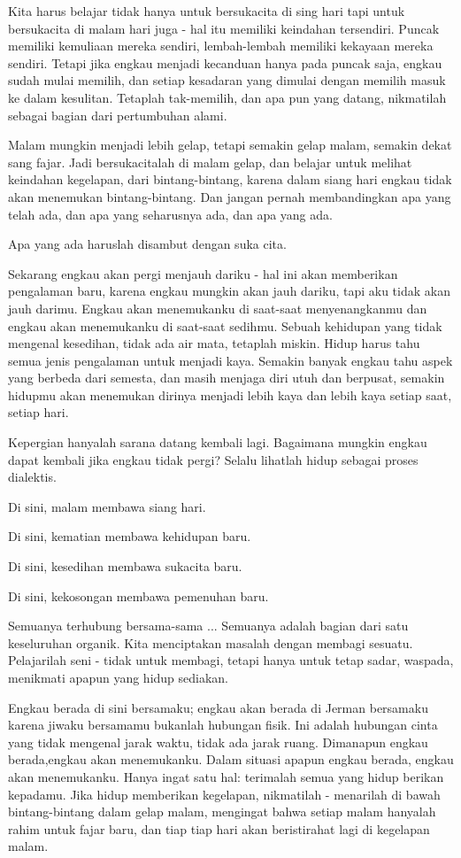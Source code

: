 Kita harus belajar tidak hanya untuk bersukacita di sing hari tapi untuk bersukacita di malam hari juga - hal itu memiliki keindahan tersendiri. Puncak memiliki kemuliaan mereka sendiri, lembah-lembah memiliki kekayaan mereka sendiri. Tetapi jika engkau menjadi kecanduan hanya pada puncak saja, engkau sudah mulai memilih, dan setiap kesadaran yang dimulai dengan memilih masuk ke dalam kesulitan. Tetaplah tak-memilih, dan apa pun yang datang, nikmatilah sebagai bagian dari pertumbuhan alami.

Malam mungkin menjadi lebih gelap, tetapi semakin gelap malam, semakin dekat sang fajar. Jadi bersukacitalah di malam gelap, dan belajar untuk melihat keindahan kegelapan, dari bintang-bintang, karena dalam siang hari engkau tidak akan menemukan bintang-bintang. Dan jangan pernah membandingkan apa yang telah ada, dan apa yang seharusnya ada, dan apa yang ada.

Apa yang ada haruslah disambut dengan suka cita.

Sekarang engkau akan pergi menjauh dariku - hal ini akan memberikan pengalaman baru, karena engkau mungkin akan jauh dariku, tapi aku tidak akan jauh darimu. Engkau akan menemukanku di saat-saat menyenangkanmu dan engkau akan menemukanku di saat-saat sedihmu. Sebuah kehidupan yang tidak mengenal kesedihan, tidak ada air mata, tetaplah miskin. Hidup harus tahu semua jenis pengalaman untuk menjadi kaya. Semakin banyak engkau tahu aspek yang berbeda dari semesta, dan masih menjaga diri utuh dan berpusat, semakin hidupmu akan menemukan dirinya menjadi lebih kaya dan lebih kaya setiap saat, setiap hari.

Kepergian hanyalah sarana datang kembali lagi. Bagaimana mungkin engkau dapat kembali jika engkau tidak pergi? Selalu lihatlah hidup sebagai proses dialektis.

Di sini, malam membawa siang hari.\par
Di sini, kematian membawa kehidupan baru.\par
Di sini, kesedihan membawa sukacita baru.\par
Di sini, kekosongan membawa pemenuhan baru.\par

Semuanya terhubung bersama-sama ... Semuanya adalah bagian dari satu keseluruhan organik. Kita menciptakan masalah dengan membagi sesuatu. Pelajarilah seni - tidak untuk membagi, tetapi hanya untuk tetap sadar, waspada, menikmati apapun yang hidup sediakan.

Engkau berada di sini bersamaku; engkau akan berada di Jerman bersamaku karena jiwaku bersamamu bukanlah hubungan fisik. Ini adalah hubungan cinta yang tidak mengenal jarak waktu, tidak ada jarak ruang. Dimanapun engkau berada,engkau akan menemukanku. Dalam situasi apapun engkau berada, engkau akan menemukanku. Hanya ingat satu hal: terimalah semua yang hidup berikan kepadamu. Jika hidup memberikan kegelapan, nikmatilah - menarilah di bawah bintang-bintang dalam gelap malam, mengingat bahwa setiap malam hanyalah rahim untuk fajar baru, dan tiap tiap hari akan beristirahat lagi di kegelapan malam.

